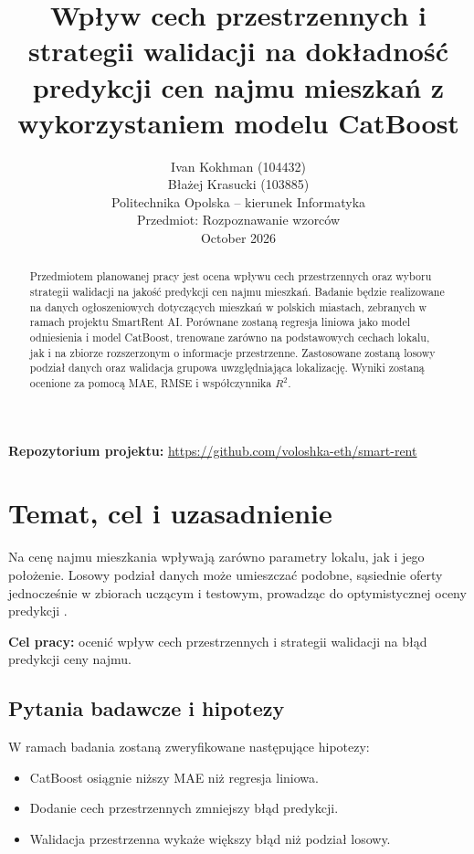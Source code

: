 \documentclass[10pt,a4paper]{article}
\title{
	\textbf{
		Wpływ cech przestrzennych i strategii walidacji
		na dokładność predykcji cen najmu mieszkań
		z wykorzystaniem modelu CatBoost
	}
	\\[0.6em]
}
\author{
	Ivan Kokhman (104432)\\
	Błażej Krasucki (103885)\\[0.8em]
	{\normalsize Politechnika Opolska -- kierunek Informatyka}\\[0.3em]
	{\normalsize Przedmiot: Rozpoznawanie wzorców}\\[0.8em]
	{\normalsize October 2026}
}
\date{}
\begin{document}
	
	\maketitle
	
	
	
	\begin{abstract}
		Przedmiotem planowanej pracy jest ocena wpływu cech przestrzennych
		oraz wyboru strategii walidacji na jakość predykcji cen najmu mieszkań.
		Badanie będzie realizowane na danych ogłoszeniowych dotyczących mieszkań
		w polskich miastach, zebranych w ramach projektu SmartRent AI.
		Porównane zostaną regresja liniowa jako model odniesienia i model CatBoost,
		trenowane zarówno na podstawowych cechach lokalu, jak i na zbiorze
		rozszerzonym o informacje przestrzenne.
		Zastosowane zostaną losowy podział danych oraz walidacja grupowa
		uwzględniająca lokalizację.
		Wyniki zostaną ocenione za pomocą MAE, RMSE i współczynnika $R^2$.
	\end{abstract}
	
	\noindent

	\noindent
	\textbf{Repozytorium projektu:}
	\url{https://github.com/voloshka-eth/smart-rent}
	
	\newpage
	\section{Temat, cel i uzasadnienie}
	
	Na cenę najmu mieszkania wpływają zarówno parametry lokalu,
	jak i jego położenie. Losowy podział danych może umieszczać
	podobne, sąsiednie oferty jednocześnie w zbiorach uczącym
	i testowym, prowadząc do optymistycznej oceny predykcji
	\cite{roberts2017}.
	
	\noindent
	\textbf{Cel pracy:}
	ocenić wpływ cech przestrzennych i strategii walidacji
	na błąd predykcji ceny najmu.
	
	\subsection{Pytania badawcze i hipotezy}
	
	W ramach badania zostaną zweryfikowane następujące hipotezy:
	
	\begin{itemize}
		\item CatBoost osiągnie niższy MAE niż regresja liniowa.
		\item Dodanie cech przestrzennych zmniejszy błąd predykcji.
		\item Walidacja przestrzenna wykaże większy błąd niż podział losowy.
	\end{itemize}
	
\end{document}
